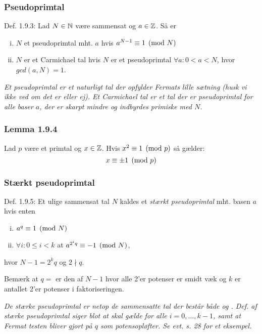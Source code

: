 \subsubsection{Pseudoprimtal}
\label{Pseudoprimtal}
Def. 1.9.3: Lad $N \in \mathbb{N}$ være sammensat og $a \in \mathbb{Z}$. Så er
\begin{enumerate}[(i)]
  \item $N$ et pseudoprimtal mht. $a$ hvis $a^{N-1} \equiv 1 \pmod{N}$
  \item $N$ er et Carmichael tal hvis $N$ er et pseudoprimtal $\forall a: 0 < a
  < N$, hvor $gcd(a,N) = 1$.
\end{enumerate}
\textit{Et pseudoprimtal er et naturligt tal der opfylder Fermats lille sætning
(husk vi ikke ved om det er  eller ej). Et Carmichael tal er et
tal der er pseudoprimtal for alle baser $a$, der er skarpt mindre og indbyrdes
primiske med $N$.}

\subsubsection{Lemma 1.9.4}
\label{1.9.4}
Lad $p$ være et primtal og $x \in \mathbb{Z}$. Hvis $x^2\equiv 1 \pmod{p}$ så gælder:
\begin{equation*}
  x \equiv \pm 1 \pmod{p}
\end{equation*}

\subsubsection{Stærkt pseudoprimtal}
\label{Staerkt pseudoprimtal}
Def. 1.9.5: Et ulige sammensat tal $N$ kaldes et \textit{stærkt pseudoprimtal}
mht. basen $a$ hvis enten
\begin{enumerate}[(i)]
  \item $a^q \equiv 1 \pmod{N}$
  \item $\forall i: 0 \leq i < k$ at $a^{2^{i}q}\equiv -1 \pmod{N}$,
\end{enumerate}
hvor $N -1 = 2^{k}q$ og $2 \nmid q$.

Bemærk at $q =$ er den  af $N -1$ hvor
alle 2'er potenser er smidt væk og $k$ er antallet 2'er potenser i
faktoriseringen.

\textit{De stærke pseudoprimtal er netop de sammensatte tal der består både
 og . Def. af stærke
pseudoprimtal siger blot at  skal gælde for alle $ i =
0,\ldots,k-1$, samt at Fermat testen bliver gjort på $q$ som potensopløfter. Se
evt. s. 28 for et eksempel.}

